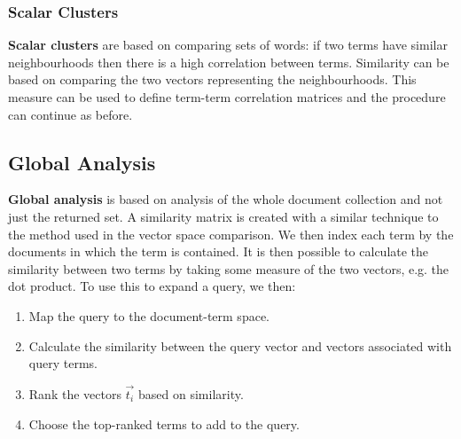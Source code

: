 \documentclass[a4paper,11pt]{article}
\begin{document}
\subsubsection{Scalar Clusters}
\textbf{Scalar clusters} are based on comparing sets of words:
if two terms have similar neighbourhoods then there is a high correlation between terms.
Similarity can be based on comparing the two vectors representing the neighbourhoods.
This measure can be used to define term-term correlation matrices and the procedure can continue as before.

\subsection{Global Analysis}
\textbf{Global analysis} is based on analysis of the whole document collection and not just the returned set.
A similarity matrix is created with a similar technique to the method used in the vector space comparison.
We then index each term by the documents in which the term is contained.
It is then possible to calculate the similarity between two terms by taking some measure of the two vectors, e.g. the dot product.
To use this to expand a query, we then:
\begin{enumerate}
    \item   Map the query to the document-term space.
    \item   Calculate the similarity between the query vector and vectors associated with query terms.
    \item   Rank the vectors $\vec{t_i}$ based on similarity.
    \item   Choose the top-ranked terms to add to the query.
\end{enumerate}
\end{document}
